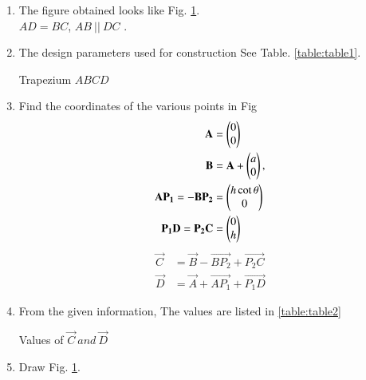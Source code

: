 \renewcommand{\theequation}{\theenumi}
\begin{enumerate}[label=\thesection.\arabic*.,ref=\thesection.\theenumi]

\begin{figure}[!ht]
\centering
\resizebox{\columnwidth}{!}{}
\caption{Trapezium by Latex-Tikz}
\label{fig:trapezium}	
\end{figure}

\item The figure obtained looks like Fig. \ref{fig:trapezium}.\\
 $AD = BC$, $AB \ ||\  DC$ . 

\item The design parameters used for construction See Table. \ref{table:table1}.
\begin{table}[ht!]
\centering

\caption{Trapezium $ABCD$}
\label{table:table1}	
\end{table} 

\item Find the coordinates of the various points in Fig
\begin{align}
\mathbf{A} &=\begin{pmatrix}0\\0\end{pmatrix} \label{eq:constr_a}\\
\mathbf{B} &=\mathbf{A} + \begin{pmatrix}a\\0\end{pmatrix}, \label{eq:constr_b}\\ 
\mathbf{AP_1} = -\mathbf{BP_2} &= \begin{pmatrix}h\cot{\theta}\\0\end{pmatrix}\label{eq:constr_ap1}\\
\mathbf{P_1D} = \mathbf{P_2C} &= \begin{pmatrix}0\\h\end{pmatrix}\label{eq:constr_bp2}
\end{align}
\begin{align}
\vec{C} &= \vec{B} - \vec{BP_2} + \vec{P_2C}\label{eq:constr_c}\\
\vec{D} &= \vec{A} + \vec{AP_1} + \vec{P_1D}\label{eq:constr_d}
\end{align}

\item
\solution From the given information, 
The values are listed in \ref{table:table2}\\
\begin{table}[ht!]
\centering

\caption{Values of $\vec{C}\  and\  \vec{D}$}
\label{table:table2}	
\end{table} 

\vskip75pt 
\item Draw Fig. \ref{fig:trapezium}.


\end{enumerate}
